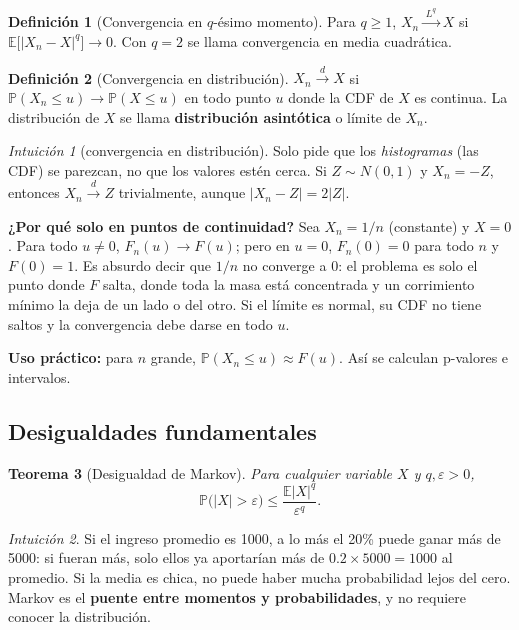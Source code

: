 \documentclass[11pt,a4paper]{article}
\theoremstyle{plain}
\newtheorem{teorema}{Teorema}[section]
\theoremstyle{definition}
\newtheorem{definicion}[teorema]{Definición}
\theoremstyle{remark}
\newtheorem*{intuicion}{Intuición}
\newcommand{\E}{\mathbb{E}}
\renewcommand{\P}{\mathbb{P}}
\newcommand{\cd}{\xrightarrow{\;d\;}}
\newcommand{\cL}[1]{\xrightarrow{\;L^{#1}\;}}
\begin{document}
\begin{definicion}[Convergencia en $q$-ésimo momento]\label{def:cLq}
Para $q\ge1$, $X_n\cL{q}X$ si $\E\big[|X_n-X|^q\big]\to0$. Con $q=2$ se llama convergencia en
media cuadrática.
\end{definicion}

\begin{definicion}[Convergencia en distribución]\label{def:cdist}
$X_n\cd X$ si $\P(X_n\le u)\to\P(X\le u)$ en todo punto $u$ donde la CDF de $X$ es continua.
La distribución de $X$ se llama \textbf{distribución asintótica} o límite de $X_n$.
\end{definicion}

\begin{intuicion}[convergencia en distribución]
Solo pide que los \emph{histogramas} (las CDF) se parezcan, no que los valores estén cerca.
Si $Z\sim N(0,1)$ y $X_n=-Z$, entonces $X_n\cd Z$ trivialmente, aunque $|X_n-Z|=2|Z|$.

\textbf{¿Por qué solo en puntos de continuidad?} Sea $X_n=1/n$ (constante) y $X=0$. Para todo
$u\neq0$, $F_n(u)\to F(u)$; pero en $u=0$, $F_n(0)=0$ para todo $n$ y $F(0)=1$. Es absurdo
decir que $1/n$ no converge a $0$: el problema es solo el punto donde $F$ salta, donde toda la
masa está concentrada y un corrimiento mínimo la deja de un lado o del otro. Si el límite es
normal, su CDF no tiene saltos y la convergencia debe darse en todo $u$.

\textbf{Uso práctico:} para $n$ grande, $\P(X_n\le u)\approx F(u)$. Así se calculan p-valores e
intervalos.
\end{intuicion}

\subsection{Desigualdades fundamentales}

\begin{teorema}[Desigualdad de Markov]\label{teo:markov}
Para cualquier variable $X$ y $q,\varepsilon>0$,
\[
\P\big(|X|>\varepsilon\big)\le\frac{\E|X|^q}{\varepsilon^q}.
\]
\end{teorema}

\begin{intuicion}
Si el ingreso promedio es 1000, a lo más el 20\% puede ganar más de 5000: si fueran más, solo
ellos ya aportarían más de $0.2\times5000=1000$ al promedio. Si la media es chica, no puede
haber mucha probabilidad lejos del cero. Markov es el \textbf{puente entre momentos y
probabilidades}, y no requiere conocer la distribución.
\end{intuicion}
\end{document}
